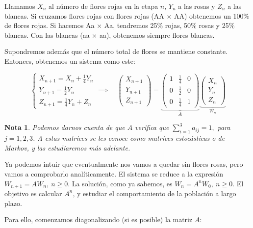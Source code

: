 \documentclass[11pt, a4paper]{article}
\newif\IfInSansMode
\numberwithin{equation}{section}
\theoremstyle{theorem-style}
\theoremstyle{definition-style}
\theoremstyle{remark-style}
\newtheorem*{nota}{Nota}
\theoremstyle{example-style}
\begin{document}
Llamamos $X_n$ al número de flores rojas en la etapa $n$, $Y_n$ a las rosas y $Z_n$ a
las blancas. Si cruzamos flores rojas con flores rojas (AA $\times$ AA) obtenemos
un 100\% de flores rojas. Si hacemos Aa $\times$ Aa, tendremos 25\% rojas, 50\% rosas y
25\% blancas. Con las blancas (aa $\times$ aa), obtenemos siempre flores blancas.

Supondremos además que el número total de flores se mantiene constante. Entonces, obtenemos un sistema como este:

$$
\begin{cases}
  X_{n+1} = X_n + \frac{1}{4}Y_n \\
  Y_{n+1} = \frac{1}{2}Y_n \\
  Z_{n+1} = \frac{1}{4}Y_n + Z_n
\end{cases} \implies \quad \begin{pmatrix}
  X_{n+1} \\
  Y_{n+1} \\
  Z_{n+1}
\end{pmatrix} =
\underbrace{\begin{pmatrix}
  1 & \frac{1}{4} & 0 \\
  0 & \frac{1}{2} & 0 \\
  0 & \frac{1}{4} & 1
\end{pmatrix}}_A
\underbrace{\begin{pmatrix}
  X_n \\
  Y_n \\
  Z_n
\end{pmatrix}}_{W_n}$$

\begin{nota}
	Podemos darnos cuenta de que $A$ verifica que $\sum_{i=1}^3 a_{ij} = 1,$ para $j=1,2,3$. A estas matrices se les conoce como \textit{matrices estocásticas} o \textit{de Markov}, y las estudiaremos más adelante.
\end{nota}

Ya podemos intuir que eventualmente nos vamos a quedar sin flores rosas, pero
vamos a comprobarlo analíticamente.
El sistema se reduce a la expresión $W_{n+1} = AW_n,\ n \geq 0$. La solución, como ya sabemos, es $W_n = A^nW_0,\ n \ge 0$. El objetivo es calcular $A^n$, y estudiar el comportamiento de la población a largo plazo.

Para ello, comenzamos diagonalizando (si es posible) la matriz $A$:
\end{document}
